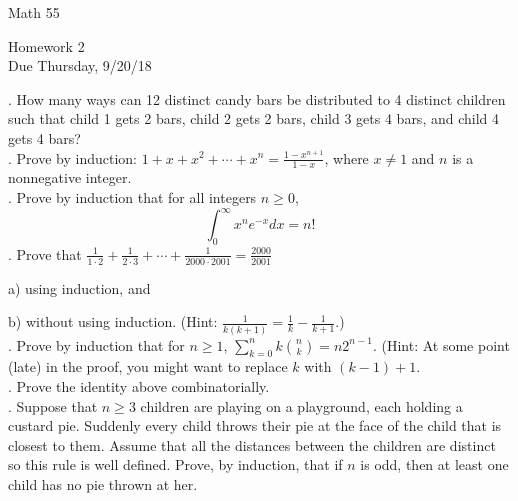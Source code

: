 
\pagestyle{empty}

\setlength{\textheight}{7in}
\addtolength{\topmargin}{-.5in}

                                                             

\centerline{\large \sc Math 55} 

\smallskip

\begin{center}
{\large Homework 2\\
Due Thursday, 9/20/18}
\end{center}

\medskip

\medskip

. How many ways can 12 distinct candy bars be
distributed to 4 distinct children such that child 1 gets 2 bars,
child 2 gets 2 bars, child 3 gets 4 bars, and child 4 gets 4
bars? \\
\newpage
{}. Prove by induction:
$1+x+x^2+\cdots+x^n=\frac{1-x^{n+1}}{1-x}$, where $x\neq 1$ and
$n$ is a nonnegative integer. \\
\newpage
{}. Prove by induction that for all integers $n\geq 0$, 
$$\int_0^{\infty} x^n e^{-x} dx = n!$$
\newpage
{}.  Prove that
$\frac{1}{1\cdot2}+\frac{1}{2\cdot3}+\cdots+\frac{1}{2000\cdot2001}=
\frac{2000}{2001}$

a) using induction, and 

b) without using induction. (Hint: $\frac{1}{k(k+1)} = \frac{1}{k} - \frac{1}{k+1}$.) \\
\newpage
{}. Prove by induction that for $n\geq 1$, $\sum_{k=0}^n k{n\choose k} = n2^{n-1}.$
(Hint: At some point (late) in the proof, you might want to replace $k$ with $(k-1) + 1$. \\
\newpage
{}. Prove the identity above combinatorially. \\
\newpage
{}. Suppose that $n\geq 3$ children are playing on a
playground, each holding a custard pie. Suddenly every child throws
their pie at the face of the child that is closest to them. Assume
that all the distances between the children are distinct so this rule
is well defined. Prove, by induction, that if $n$ is odd, then at
least one child has no pie thrown at her.


